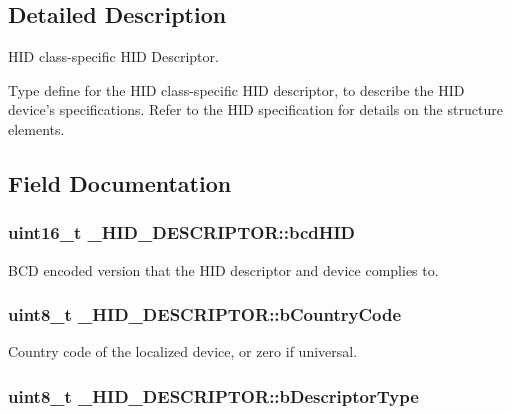 \subsection{Detailed Description}
H\-I\-D class-\/specific H\-I\-D Descriptor. 

Type define for the H\-I\-D class-\/specific H\-I\-D descriptor, to describe the H\-I\-D device's specifications. Refer to the H\-I\-D specification for details on the structure elements. 

\subsection{Field Documentation}
\hypertarget{struct__HID__DESCRIPTOR_acb02b2afae4c474d60d3ce5ea90d6b3d}{
\subsubsection[{bcd\-H\-I\-D}]{\setlength{\rightskip}{0pt plus 5cm}uint16\-\_\-t \-\_\-\-H\-I\-D\-\_\-\-D\-E\-S\-C\-R\-I\-P\-T\-O\-R\-::bcd\-H\-I\-D}}\label{struct__HID__DESCRIPTOR_acb02b2afae4c474d60d3ce5ea90d6b3d}
B\-C\-D encoded version that the H\-I\-D descriptor and device complies to. \hypertarget{struct__HID__DESCRIPTOR_a6d494d09bf37ea067da3a089f0c966ba}{
\subsubsection[{b\-Country\-Code}]{\setlength{\rightskip}{0pt plus 5cm}uint8\-\_\-t \-\_\-\-H\-I\-D\-\_\-\-D\-E\-S\-C\-R\-I\-P\-T\-O\-R\-::b\-Country\-Code}}\label{struct__HID__DESCRIPTOR_a6d494d09bf37ea067da3a089f0c966ba}
Country code of the localized device, or zero if universal. \hypertarget{struct__HID__DESCRIPTOR_a212247b88d45fcb74da281192f9d4d02}{
\subsubsection[{b\-Descriptor\-Type}]{\setlength{\rightskip}{0pt plus 5cm}uint8\-\_\-t \-\_\-\-H\-I\-D\-\_\-\-D\-E\-S\-C\-R\-I\-P\-T\-O\-R\-::b\-Descriptor\-Type}}\label{struct__HID__DESCRIPTOR_a212247b88d45fcb74da281192f9d4d02}
